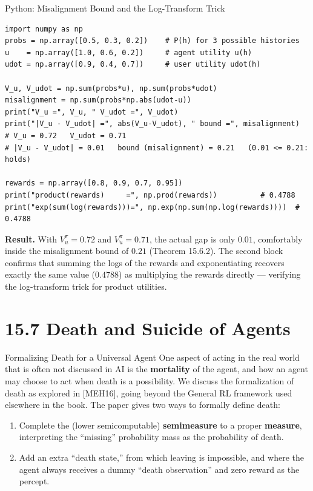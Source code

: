 \documentclass[aspectratio=169,10pt]{beamer}
\begin{document}
\begin{frame}[fragile]{Python: Misalignment Bound and the Log-Transform Trick}
  \begin{lstlisting}
import numpy as np
probs = np.array([0.5, 0.3, 0.2])    # P(h) for 3 possible histories
u    = np.array([1.0, 0.6, 0.2])     # agent utility u(h)
udot = np.array([0.9, 0.4, 0.7])     # user utility udot(h)

V_u, V_udot = np.sum(probs*u), np.sum(probs*udot)
misalignment = np.sum(probs*np.abs(udot-u))
print("V_u =", V_u, " V_udot =", V_udot)
print("|V_u - V_udot| =", abs(V_u-V_udot), " bound =", misalignment)
# V_u = 0.72   V_udot = 0.71
# |V_u - V_udot| = 0.01   bound (misalignment) = 0.21   (0.01 <= 0.21: holds)

rewards = np.array([0.8, 0.9, 0.7, 0.95])
print("product(rewards)     =", np.prod(rewards))          # 0.4788
print("exp(sum(log(rewards)))=", np.exp(np.sum(np.log(rewards))))  # 0.4788
  \end{lstlisting}
  \textbf{Result.} With $V^\pi_u=0.72$ and $V^\pi_{\dot u}=0.71$, the
  actual gap is only $0.01$, comfortably inside the misalignment bound of
  $0.21$ (Theorem 15.6.2). The second block confirms that summing the logs
  of the rewards and exponentiating recovers exactly the same value
  ($0.4788$) as multiplying the rewards directly --- verifying the
  log-transform trick for product utilities.
\end{frame}

\section{15.7 Death and Suicide of Agents}

\begin{frame}{Formalizing Death for a Universal Agent}
  One aspect of acting in the real world that is often not discussed in
  AI is the \textbf{mortality} of the agent, and how an agent may choose
  to act when death is a possibility. We discuss the formalization of
  death as explored in [MEH16], going beyond the General RL framework used
  elsewhere in the book. The paper gives two ways to formally define
  death:
  \begin{enumerate}
    \item Complete the (lower semicomputable) \textbf{semimeasure} to a
      proper \textbf{measure}, interpreting the ``missing'' probability
      mass as the probability of death.
    \item Add an extra ``death state,'' from which leaving is impossible,
      and where the agent always receives a dummy ``death observation''
      and zero reward as the percept.
  \end{enumerate}
\end{frame}
\end{document}

